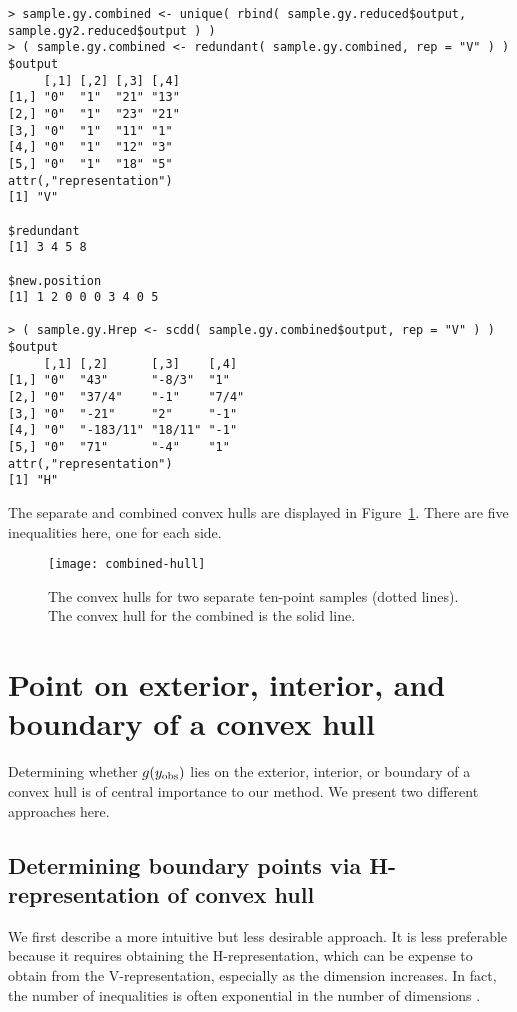 \begin{verbatim}
> sample.gy.combined <- unique( rbind( sample.gy.reduced$output, 
sample.gy2.reduced$output ) )
> ( sample.gy.combined <- redundant( sample.gy.combined, rep = "V" ) )
$output
     [,1] [,2] [,3] [,4]
[1,] "0"  "1"  "21" "13"
[2,] "0"  "1"  "23" "21"
[3,] "0"  "1"  "11" "1" 
[4,] "0"  "1"  "12" "3" 
[5,] "0"  "1"  "18" "5" 
attr(,"representation")
[1] "V"

$redundant
[1] 3 4 5 8

$new.position
[1] 1 2 0 0 0 3 4 0 5

> ( sample.gy.Hrep <- scdd( sample.gy.combined$output, rep = "V" ) )
$output
     [,1] [,2]      [,3]    [,4] 
[1,] "0"  "43"      "-8/3"  "1"  
[2,] "0"  "37/4"    "-1"    "7/4"
[3,] "0"  "-21"     "2"     "-1" 
[4,] "0"  "-183/11" "18/11" "-1" 
[5,] "0"  "71"      "-4"    "1"  
attr(,"representation")
[1] "H"
\end{verbatim}

The separate and combined convex hulls are displayed in Figure~\ref{F:combined-hull}.
There are five inequalities here, one for each side.
\begin{figure}[h]
\begin{center}
\texttt{[image: combined-hull]}
\end{center}
\caption{The convex hulls for two separate ten-point samples (dotted lines).  The 
convex hull for the combined is the solid line.}
\label{F:combined-hull}
\end{figure}


\section{Point on exterior, interior, and boundary of a convex hull}
Determining whether $g(y_{\text{obs}})$ lies on the exterior, interior, or boundary
of a convex hull is of central importance to our method.  We present two 
different approaches here.

\subsection{Determining boundary points via H-representation of convex hull}
\label{S:H-rep inquiry}
We first describe a more intuitive but less desirable approach.  It is less preferable because it requires obtaining the H-representation, 
which can be expense to obtain from the V-representation, 
especially as the dimension increases.  In fact, the number of inequalities 
is often exponential in the number of dimensions \citep{Fukuda:2008}.

